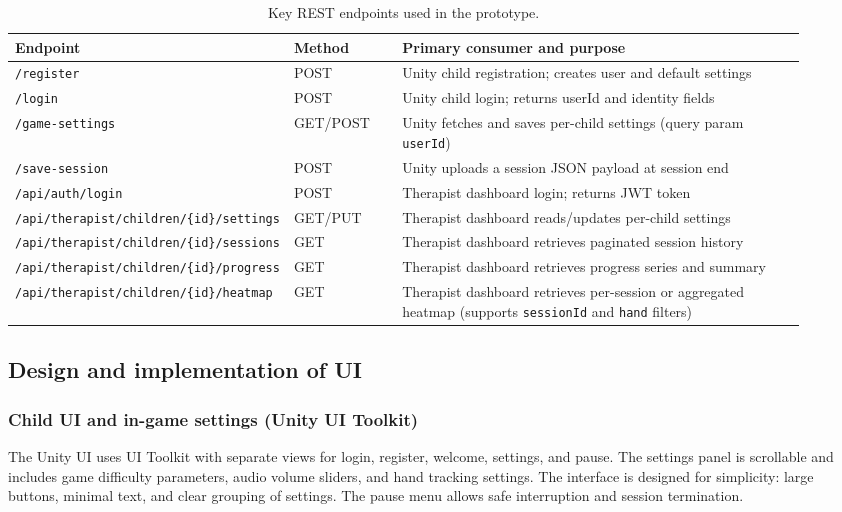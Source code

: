 \documentclass[12pt]{article}
\begin{document}
\begin{table}[H]
\centering
\caption{Key REST endpoints used in the prototype.}
\label{tab:endpoints}
\begin{tabular}{p{0.22\linewidth} p{0.14\linewidth} p{0.56\linewidth}}
\toprule
\textbf{Endpoint} & \textbf{Method} & \textbf{Primary consumer and purpose} \\
\midrule
\texttt{/register} & POST & Unity child registration; creates user and default settings \\
\texttt{/login} & POST & Unity child login; returns userId and identity fields \\
\texttt{/game-settings} & GET/POST & Unity fetches and saves per-child settings (query param \texttt{userId}) \\
\texttt{/save-session} & POST & Unity uploads a session JSON payload at session end \\
\texttt{/api/auth/login} & POST & Therapist dashboard login; returns JWT token \\
\texttt{/api/therapist/children/\{id\}/settings} & GET/PUT & Therapist dashboard reads/updates per-child settings \\
\texttt{/api/therapist/children/\{id\}/sessions} & GET & Therapist dashboard retrieves paginated session history \\
\texttt{/api/therapist/children/\{id\}/progress} & GET & Therapist dashboard retrieves progress series and summary \\
\texttt{/api/therapist/children/\{id\}/heatmap} & GET & Therapist dashboard retrieves per-session or aggregated heatmap (supports \texttt{sessionId} and \texttt{hand} filters) \\
\bottomrule
\end{tabular}
\end{table}

\subsection{Design and implementation of UI}
\subsubsection*{Child UI and in-game settings (Unity UI Toolkit)}
The Unity UI uses UI Toolkit with separate views for login, register, welcome, settings, and pause. The settings panel is scrollable and includes game difficulty parameters, audio volume sliders, and hand tracking settings. The interface is designed for simplicity: large buttons, minimal text, and clear grouping of settings. The pause menu allows safe interruption and session termination.
\end{document}
